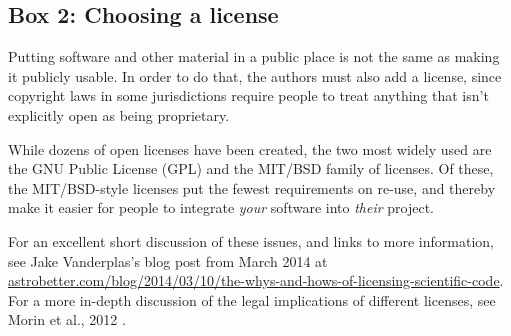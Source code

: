 \subsection{Box 2: Choosing a license}

Putting software and other material in a public place is not the same
as making it publicly usable.  In order to do that, the authors must
also add a license, since copyright laws in some jurisdictions require
people to treat anything that isn't explicitly open as being
proprietary.

While dozens of open licenses have been created, the two most widely
used are the GNU Public License (GPL) and the MIT/BSD family of
licenses.  Of these, the MIT/BSD-style licenses put the fewest
requirements on re-use, and thereby make it easier for people to
integrate \emph{your} software into \emph{their} project.

For an excellent short discussion of these issues, and links to more
information, see Jake Vanderplas's blog post from March 2014 at
\href{http://www.astrobetter.com/blog/2014/03/10/the-whys-and-hows-of-licensing-scientific-code/}{astrobetter.com/blog/2014/03/10/the-whys-and-hows-of-licensing-scientific-code}.
For a more in-depth discussion of the legal implications of different licenses, see Morin et al., 2012 \cite{22844236}.
